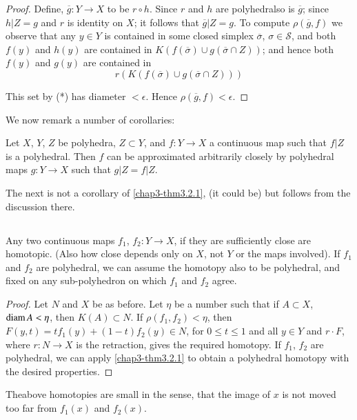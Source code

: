 \begin{proof}
Define, $\overline{g}:Y\to X$ to be $r\circ h$. Since $r$ and $h$ are polyhedral\pageoriginale so is $\overline{g}$; since $h|Z=g$ and $r$ is identity on $X$; it follows that $\overline{g}|Z=g$. To compute $\rho(\overline{g},f)$ we observe that any $y\in Y$ is contained in some closed simplex $\overline{\sigma}$, $\sigma\in \mathscr{S}$, and both $f(y)$ and $h(y)$ are contained in $K(f(\overline{\sigma})\cup g(\overline{\sigma}\cap Z))$; and hence both $f(y)$ and $g(y)$ are contained in 
$$
r(K(f(\overline{\sigma})\cup g(\overline{\sigma}\cap Z)))
$$

This set by (*) has diameter $<\epsilon$. Hence $\rho(\overline{g},f)<\epsilon$.
\end{proof}

We now remark a number of corollaries:

\begin{corollary}\label{chap3-coro3.2.2}
Let $X$, $Y$, $Z$ be polyhedra, $Z\subset Y$, and $f:Y\to X$ a continuous map such that $f|Z$ is a polyhedral. Then $f$ can be approximated arbitrarily closely by polyhedral maps $g:Y\to X$ such that $g|Z=f|Z$.
\end{corollary}

The next is not a corollary of \ref{chap3-thm3.2.1}, (it could be) but follows from the discussion there.

\setcounter{subsection}{2}
\subsection{}\label{chap3-sec3.2.3}
Any two continuous maps $f_{1}$, $f_{2}:Y\to X$, if they are sufficiently close are homotopic. (Also how close depends only on $X$, not $Y$ or the maps involved). If $f_{1}$ and $f_{2}$ are polyhedral, we can assume the homotopy also to be polyhedral, and fixed on any sub-polyhedron on which $f_{1}$ and $f_{2}$ agree.

\begin{proof}
Let $N$ and $X$ be as before. Let $\eta$ be a number such that if $A\subset X$, $\operatorname{diam} A<\eta$, then $K(A)\subset N$. If $\rho(f_{1},f_{2})<\eta$, then $F(y,t)=tf_{1}(y)+(1-t)f_{2}(y)\in N$, for $0\leq t\leq 1$ and all $y\in Y$ and $r\cdot F$, where $r:N\to X$ is the retraction, gives the required homotopy. If $f_{1}$, $f_{2}$ are polyhedral, we can apply \ref{chap3-thm3.2.1} to obtain a polyhedral homotopy with the desired properties.
\end{proof}

\begin{remark*}
The\pageoriginale above homotopies are small in the sense, that the image of $x$ is not moved too far from $f_{1}(x)$ and $f_{2}(x)$.
\end{remark*}

